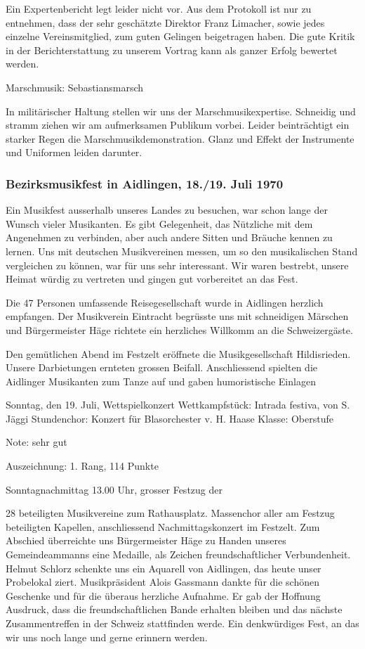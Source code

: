 \begin{history}
    Ein Expertenbericht legt leider nicht vor. Aus dem Protokoll ist nur zu
    entnehmen, dass der sehr geschätzte Direktor Franz Limacher, sowie jedes
    einzelne Vereinsmitglied, zum guten Gelingen beigetragen haben. Die gute
    Kritik in der Berichterstattung zu unserem Vortrag kann als ganzer Erfolg
    bewertet werden.

    Marschmusik: Sebastiansmarsch

    In militärischer Haltung stellen wir uns der Marschmusikexpertise. Schneidig
    und stramm ziehen wir am aufmerksamen Publikum vorbei. Leider beinträchtigt
    ein starker Regen die Marschmusikdemonstration. Glanz und Effekt der
    Instrumente und Uniformen leiden darunter.

    \subsubsection*{Bezirksmusikfest in Aidlingen, 18./19. Juli 1970}

    Ein Musikfest ausserhalb unseres Landes zu besuchen, war schon lange der
    Wunsch vieler Musikanten. Es gibt Gelegenheit, das Nützliche mit dem
    Angenehmen zu verbinden, aber auch andere Sitten und Bräuche kennen zu
    lernen. Uns mit deutschen Musikvereinen messen, um so den musikalischen
    Stand vergleichen zu können, war für uns sehr interessant. Wir waren
    bestrebt, unsere Heimat würdig zu vertreten und gingen gut vorbereitet an
    das Fest.

    Die 47 Personen umfassende Reisegesellschaft wurde in Aidlingen herzlich
    empfangen. Der Musikverein Eintracht begrüsste uns mit schneidigen Märschen
    und Bürgermeister Häge richtete ein herzliches Willkomm an die
    Schweizergäste.

    Den gemütlichen Abend im Festzelt eröffnete die Musikgesellschaft
    Hildisrieden. Unsere Darbietungen ernteten grossen Beifall. Anschliessend
    spielten die Aidlinger Musikanten zum Tanze auf und gaben humoristische
    Einlagen

    Sonntag, den 19. Juli, Wettspielkonzert Wettkampfstück: Intrada festiva, von
    S. Jäggi Stundenchor: Konzert für Blasorchester v. H. Haase Klasse:
    Oberstufe

    Note: sehr gut

    Auszeichnung: 1. Rang, 114 Punkte

    Sonntagnachmittag 13.00 Uhr, grosser Festzug der

    28 beteiligten Musikvereine zum Rathausplatz. Massenchor aller am Festzug
    beteiligten Kapellen, anschliessend Nachmittagskonzert im Festzelt. Zum
    Abschied überreichte uns Bürgermeister Häge zu Handen unseres
    Gemeindeammanns eine Medaille, als Zeichen freundschaftlicher Verbundenheit.
    Helmut Schlorz schenkte uns ein Aquarell von Aidlingen, das heute unser
    Probelokal ziert. Musikpräsident Alois Gassmann dankte für die schönen
    Geschenke und für die überaus herzliche Aufnahme. Er gab der Hoffnung
    Ausdruck, dass die freundschaftlichen Bande erhalten bleiben und das nächste
    Zusammentreffen in der Schweiz stattfinden werde. Ein denkwürdiges Fest, an
    das wir uns noch lange und gerne erinnern werden.



\end{history}
